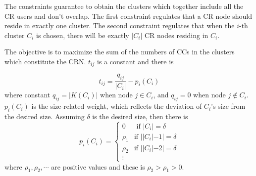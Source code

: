 \documentclass[times]{ettauth}
\theoremstyle{mytheoremstyle}
\theoremstyle{mytheoremstyle}
\theoremstyle{mytheoremstyle}
\begin{document}
The constraints guarantee to obtain the clusters which together include all the CR users and don't overlap.
The first constraint regulates that a CR node should reside in exactly one cluster.
The second constraint regulates that when the $i$-th cluster $C_i$ is chosen, there will be exactly $|C_i|$ CR nodes residing in $C_i$.

The objective is to maximize the sum of the numbers of CCs in the clusters which constitute the CRN.
$t_{ij}$ is a constant and there is
%
%

\begin{equation}
t_{ij} = \frac{q_{ij}}{|C_i|} - p_i(C_i)
\end{equation}
where constant $q_{ij}= |K(C_i)|$ when node $j\in C_i$, and $q_{ij}= 0$ when node $j\notin C_i$.
$p_i(C_i)$ is the size-related weight, which reflects the deviation of $C_i$'s size from the desired size.
Assuming $\delta$ is the desired size, then there is
$$
p_i(C_i) = \left\{ \begin{array}{rl}
0 &\mbox{ if $|C_i|=\delta$} \\
\rho_1 &\mbox{if $||C_i|-1|=\delta$} \\
\rho_2 &\mbox{if $||C_i|-2|=\delta$} \\
\vdots
\end{array} \right.
$$
where $\rho_1, \rho_2, \cdots$ are positive values and these is $\rho_2> \rho_1>0$.

\end{document}
